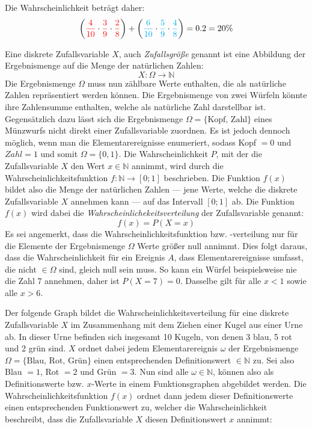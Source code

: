 \vspace{\parskip}

Die Wahrscheinlichkeit betr\"{a}gt daher: $$\left({\color{red} \frac{4}{10}} \cdot {\color{red} \frac{3}{9}} \cdot {\color{red} \frac{2}{8}}\right) + \left({\color{cyan} \frac{6}{10}} \cdot {\color{cyan}\frac{5}{9}} \cdot {\color{cyan}\frac{4}{8}}\right) = 0.2 = 20 \%$$


Eine diskrete Zufallsvariable $X$, auch \emph{Zufallsgr\"{o}\ss{}e} genannt ist eine Abbildung der Ergebnismenge auf die Menge der nat\"{u}rlichen Zahlen: $$X: \Omega \rightarrow \mathbb{N}$$ Die Ergebnismenge $\Omega$ muss nun z\"{a}hlbare Werte enthalten, die als nat\"{u}rliche Zahlen repr\"{a}sentiert werden k\"{o}nnen. Die Ergebnismenge von zwei W\"{u}rfeln k\"{o}nnte ihre Zahlensumme enthalten, welche als nat\"{u}rliche Zahl darstellbar ist. Gegens\"{a}tzlich dazu l\"{a}sst sich die Ergebnismenge $\Omega = \{ \text{Kopf, Zahl} \}$ eines M\"{u}nzwurfs nicht direkt einer Zufallsvariable zuordnen. Es ist jedoch dennoch m\"{o}glich, wenn man die Elementarereignisse enumeriert, sodass Kopf $= 0$ und $Zahl = 1$ und somit $\Omega = \{0 , 1\}$. Die Wahrscheinlichkeit $P$, mit der die Zufallsvariable $X$ den Wert $x \in \mathbb{N}$ annimmt, wird durch die Wahrscheinlichkeitsfunktion $f: \mathbb{N} \rightarrow [0 ; 1]$ beschrieben. Die Funktion $f(x)$ bildet also die Menge der nat\"{u}rlichen Zahlen --- jene Werte, welche die diskrete Zufallsvariable $X$ annehmen kann --- auf das Intervall $[0 ; 1]$ ab. Die Funktion $f(x)$ wird dabei die \emph{Wahrscheinlichekeitsverteilung} der Zufallsvariable genannt: $$f(x) = P(X = x)$$ Es sei angemerkt, dass die Wahrscheinlichkeitsfunktion bzw. -verteilung nur f\"{u}r die Elemente der Ergebnismenge $\Omega$ Werte gr\"{o}\ss{}er null annimmt. Dies folgt daraus, dass die Wahrscheinlichkeit f\"{u}r ein Ereignis $A$, dass Elementarereignisse umfasst, die nicht $\in \Omega$ sind, gleich null sein muss. So kann ein W\"{u}rfel beispielsweise nie die Zahl 7 annehmen, daher ist $P(X = 7) = 0$. Dasselbe gilt f\"{u}r alle $x < 1$ sowie alle $x > 6$.

\pagebreak

Der folgende Graph bildet die Wahrscheinlichkeitsverteilung f\"{u}r eine diskrete Zufallsvariable $X$ im Zusammenhang mit dem Ziehen einer Kugel aus einer Urne ab. In dieser Urne befinden sich insgesamt 10 Kugeln, von denen 3 blau, 5 rot und 2 gr\"{u}n sind. $X$ ordnet dabei jedem Elementarereignis $\omega$ der Ergebnismenge $\Omega = \{\text{Blau, Rot, Gr\"{u}n}\}$ einen entsprechenden Definitionswert $\in \mathbb{N}$ zu. Sei also Blau $= 1$, Rot $= 2$ und Gr\"{u}n $= 3$. Nun sind alle $\omega \in \mathbb{N}$, k\"{o}nnen also als Definitionswerte bzw. $x$-Werte in einem Funktionsgraphen abgebildet werden. Die Wahrscheinlichkeitsfunktion $f(x)$ ordnet dann jedem dieser Definitionswerte einen entsprechenden Funktionswert zu, welcher die Wahrscheinlichkeit beschreibt, dass die Zufallsvariable $X$ diesen Definitionswert $x$ annimmt:

